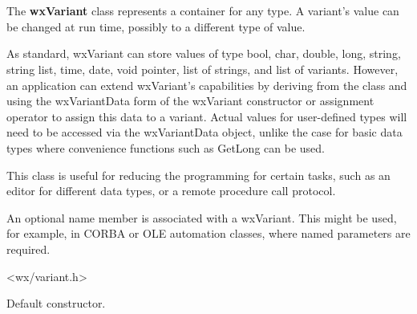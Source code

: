 
\section{}\label{wxvariant}

The {\bf wxVariant} class represents a container for any type.
A variant's value can be changed at run time, possibly to a different type of value.

As standard, wxVariant can store values of type bool, char, double, long, string,
string list, time, date, void pointer, list of strings, and list of variants. However, an application can extend wxVariant's capabilities by deriving from the class  and using the wxVariantData form of the wxVariant constructor or assignment operator to assign this data to a variant. Actual values for user-defined types will need to be accessed via the wxVariantData object, unlike the case for basic data types where convenience functions such as GetLong can be used.

This class is useful for reducing the programming for certain tasks, such as an editor
for different data types, or a remote procedure call protocol.

An optional name member is associated with a wxVariant. This might be used, for example, in CORBA
or OLE automation classes, where named parameters are required.




<wx/variant.h>




\label{wxvariantctor}


Default constructor.

